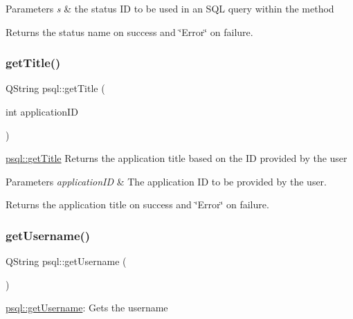 \begin{DoxyParams}{Parameters}
{\em s} & the status ID to be used in an S\+QL query within the method \\
\hline
\end{DoxyParams}
\begin{DoxyReturn}{Returns}
the status name on success and \char`\"{}\+Error\char`\"{} on failure. 
\end{DoxyReturn}
\mbox{\label{classpsql_ada9e3be3e0866011edf53e30ec510afc}} 
\subsubsection{\texorpdfstring{get\+Title()}{getTitle()}}
{\footnotesize\ttfamily Q\+String psql\+::get\+Title (\begin{DoxyParamCaption}\item[{int}]{application\+ID }\end{DoxyParamCaption})}



\mbox{\hyperlink{classpsql_ada9e3be3e0866011edf53e30ec510afc}{psql\+::get\+Title}} Returns the application title based on the ID provided by the user 


\begin{DoxyParams}{Parameters}
{\em application\+ID} & The application ID to be provided by the user. \\
\hline
\end{DoxyParams}
\begin{DoxyReturn}{Returns}
the application title on success and \char`\"{}\+Error\char`\"{} on failure. 
\end{DoxyReturn}
\mbox{\label{classpsql_aecc9fd93dc5ca0c4f4a63d445a36d166}} 
\subsubsection{\texorpdfstring{get\+Username()}{getUsername()}}
{\footnotesize\ttfamily Q\+String psql\+::get\+Username (\begin{DoxyParamCaption}{ }\end{DoxyParamCaption})}



\mbox{\hyperlink{classpsql_aecc9fd93dc5ca0c4f4a63d445a36d166}{psql\+::get\+Username}}\+: Gets the username 

